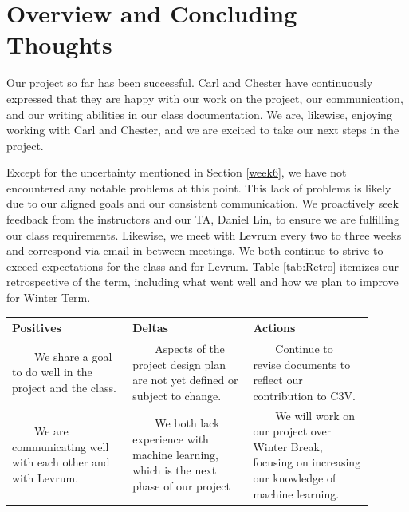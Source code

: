 \documentclass[onecolumn, draftclsnofoot,10pt, compsoc]{IEEEtran}
\newcommand{\tabitem}{~~\llap{\textbullet}~~}
\begin{document}
\section{Overview and Concluding Thoughts} \label{retro}
\begin{singlespace}
    Our project so far has been successful.
    Carl and Chester have continuously expressed that they are happy with our work on the project, our communication, and our writing abilities in our class documentation.
    We are, likewise, enjoying working with Carl and Chester, and we are excited to take our next steps in the project.
    
    Except for the uncertainty mentioned in Section \ref{week6}, we have not encountered any notable problems at this point.
    This lack of problems is likely due to our aligned goals and our consistent communication.
    We proactively seek feedback from the instructors and our TA, Daniel Lin, to ensure we are fulfilling our class requirements.
    Likewise, we meet with Levrum every two to three weeks and correspond via email in between meetings.
    We both continue to strive to exceed expectations for the class and for Levrum.
    Table \ref{tab:Retro} itemizes our retrospective of the term, including what went well and how we plan to improve for Winter Term.

        \begin{center}
         \label{tab:Retro}
        \begin{singlespace}
        \begin{tabular}{ |p{0.3\linewidth}|p{0.3\linewidth}|p{0.3\linewidth}| }
        \hline
           \textbf{Positives}
         & \textbf{Deltas}
         & \textbf{Actions}
         \\
         \hline
         \tabitem We share a goal to do well in the project and the class. 
         &%
         \tabitem Aspects of the project design plan are not yet defined or subject to change.
         &%
         \tabitem Continue to revise documents to reflect our contribution to C3V.
         \\
         
         \tabitem We are communicating well with each other and with Levrum.
         &%
         \tabitem We both lack experience with machine learning, which is the next phase of our project
         &%
         \tabitem We will work on our project over Winter Break, focusing on increasing our knowledge of machine learning. 
         \\ 
         

\end{tabular}
\end{singlespace}
\end{center}
\end{singlespace}
\end{document}
